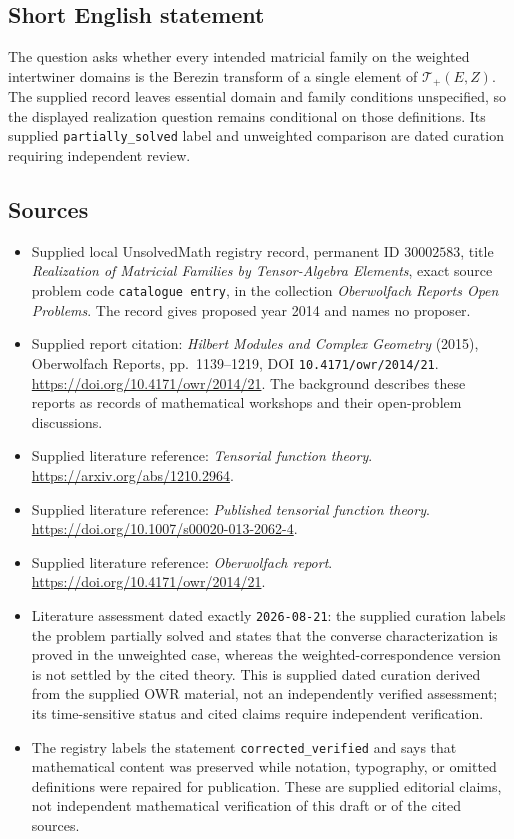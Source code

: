 \documentclass[11pt]{article}
\begin{document}
\subsection{Short English statement}
The question asks whether every intended matricial family on the weighted intertwiner domains is the Berezin transform of a single element of \(\mathcal T_+(E,Z)\). The supplied record leaves essential domain and family conditions unspecified, so the displayed realization question remains conditional on those definitions. Its supplied \texttt{partially\_solved} label and unweighted comparison are dated curation requiring independent review.
\subsection{Sources}
\begin{itemize}
\item Supplied local UnsolvedMath registry record, permanent ID \(30002583\), title \emph{Realization of Matricial Families by Tensor-Algebra Elements}, exact source problem code \texttt{catalogue entry}, in the collection \emph{Oberwolfach Reports Open Problems}. The record gives proposed year 2014 and names no proposer.
\item Supplied report citation: \emph{Hilbert Modules and Complex Geometry} (2015), Oberwolfach Reports, pp.\ 1139--1219, DOI \texttt{10.4171/owr/2014/21}. \url{https://doi.org/10.4171/owr/2014/21}. The background describes these reports as records of mathematical workshops and their open-problem discussions.
\item Supplied literature reference: \emph{Tensorial function theory}. \url{https://arxiv.org/abs/1210.2964}.
\item Supplied literature reference: \emph{Published tensorial function theory}. \url{https://doi.org/10.1007/s00020-013-2062-4}.
\item Supplied literature reference: \emph{Oberwolfach report}. \url{https://doi.org/10.4171/owr/2014/21}.
\item Literature assessment dated exactly \texttt{2026-08-21}: the supplied curation labels the problem partially solved and states that the converse characterization is proved in the unweighted case, whereas the weighted-correspondence version is not settled by the cited theory. This is supplied dated curation derived from the supplied OWR material, not an independently verified assessment; its time-sensitive status and cited claims require independent verification.
\item The registry labels the statement \texttt{corrected\_verified} and says that mathematical content was preserved while notation, typography, or omitted definitions were repaired for publication. These are supplied editorial claims, not independent mathematical verification of this draft or of the cited sources.
\end{itemize}
\end{document}
